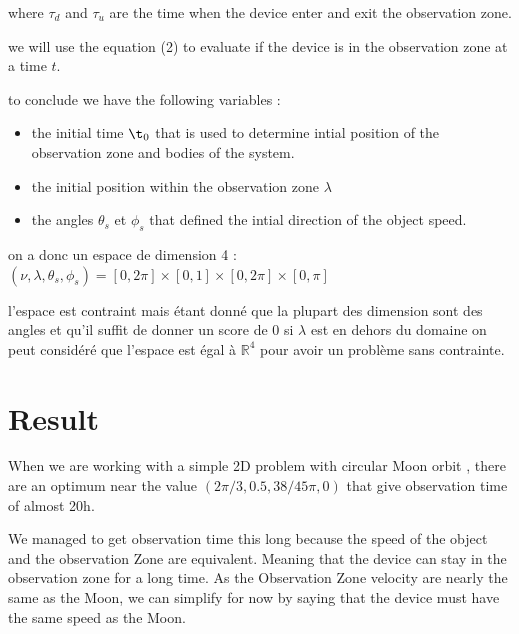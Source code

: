 \documentclass{article} %
\begin{document}
		
		where  $\tau_d$ and $\tau_u$ are the time when the device enter and exit the observation zone.
		
		we will use the equation (2) to evaluate if the device is in the observation zone at a time $t$.
		
		
		
		to conclude we have the following variables : 
		
		\begin{itemize}
			\item the initial time $\t_0$ that is used to determine intial position of the observation zone and bodies of the system.%
			\item the initial position within the observation zone $\lambda$ %
			\item the angles $\theta_s$ et $\phi_s$ that defined the intial direction of the object speed.%
		\end{itemize}
		
		on a donc un espace de dimension 4 :
		$(\nu,\lambda,\theta_s,\phi_s)=[0,2\pi]\times[0,1]\times[0,2\pi]\times[0,\pi]$
		
		l'espace est contraint mais étant donné que la plupart des dimension sont des angles et qu'il suffit de donner un score de 0 si $\lambda$ est en dehors du domaine on peut considéré que l'espace est égal à $\mathbb{R}^4$ pour avoir un problème sans contrainte.
		
		\section{Result}
			
		When we are working with a simple 2D problem with circular Moon orbit , there are an optimum near the value $(2\pi/3,0.5,38/45\pi,0)$ that give observation time of almost 20h.
		
		We managed to get observation time this long because the speed of the object and the observation Zone are equivalent. Meaning that the device can stay in the observation zone for a long time. As the Observation Zone velocity are nearly the same as the Moon, we can simplify for now by saying that the device must have the same speed as the Moon.
		
\end{document}
